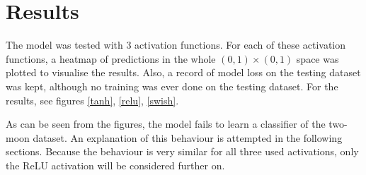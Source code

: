 \section{Results}

The model was tested with 3 activation functions. For each of these activation functions, a heatmap of predictions in the whole \( \left( 0, 1 \right) \times \left( 0, 1 \right) \) space was plotted to visualise the results. Also, a record of model loss on the testing dataset was kept, although no training was ever done on the testing dataset. For the results, see figures \ref{tanh}, \ref{relu}, \ref{swish}.

As can be seen from the figures, the model fails to learn a classifier of the two-moon dataset. An explanation of this behaviour is attempted in the following sections. Because the behaviour is very similar for all three used activations, only the ReLU activation will be considered further on.

